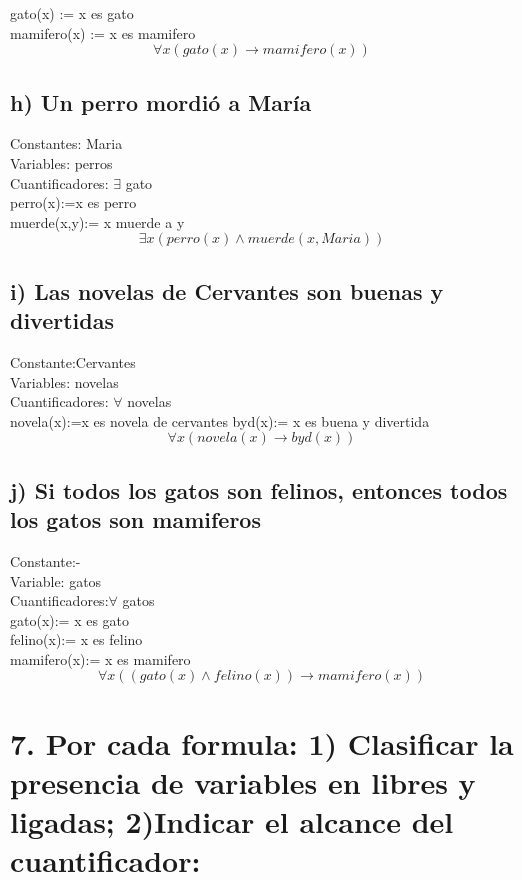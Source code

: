 \documentclass[11pt,letterpaper]{article}
\begin{document}
gato(x) := x es gato\\
mamifero(x) := x es mamifero\\
$$ \forall x (gato(x) \rightarrow mamifero(x))$$

\subsection*{h) Un perro mordió a María}
Constantes: Maria\\
Variables: perros\\
Cuantificadores: $\exists$ gato \\
perro(x):=x es perro\\
muerde(x,y):= x muerde a y\\
$$\exists x (perro(x) \land muerde(x,Maria))$$

\subsection*{i) Las novelas de Cervantes son buenas y divertidas}
Constante:Cervantes \\
Variables: novelas\\
Cuantificadores: $\forall $ novelas\\

novela(x):=x es novela de cervantes
byd(x):= x es buena y divertida
$$\forall x (novela(x) \rightarrow byd(x))$$

\subsection*{j) Si todos los gatos son felinos, entonces todos los gatos son mamiferos}
Constante:- \\
Variable: gatos\\
Cuantificadores:$\forall $ gatos\\

gato(x):= x es gato\\
felino(x):= x es felino\\
mamifero(x):= x es mamifero\\
$$\forall x((gato(x) \land felino(x)) \rightarrow mamifero(x))$$


\section*{7. Por cada formula: 1) Clasificar la presencia de variables en libres y ligadas; 2)Indicar el alcance del cuantificador:}
\end{document}

